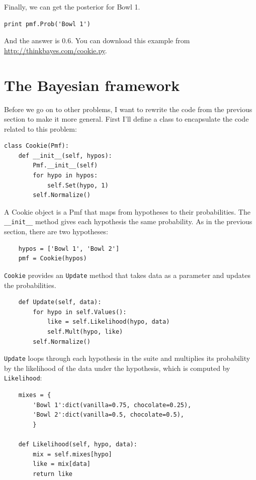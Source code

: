 \documentclass[12pt]{book}
\begin{document}
Finally, we can get the posterior for Bowl 1.

\begin{verbatim}
print pmf.Prob('Bowl 1')
\end{verbatim}

And the answer is 0.6.  You can download this example
from \url{http://thinkbayes.com/cookie.py}.


\section{The Bayesian framework}

Before we go on to other problems, I want to rewrite the code
from the previous section to make it more general.  First I'll
define a class to encapsulate the code related to this problem:

\begin{verbatim}
class Cookie(Pmf):
    def __init__(self, hypos):
        Pmf.__init__(self)
        for hypo in hypos:
            self.Set(hypo, 1)
        self.Normalize()
\end{verbatim}

A Cookie object is a Pmf that maps from hypotheses to their
probabilities.  The \verb"__init__" method gives each hypothesis
the same probability.  As in the previous section, there are
two hypotheses:

\begin{verbatim}
    hypos = ['Bowl 1', 'Bowl 2']
    pmf = Cookie(hypos)
\end{verbatim}

\verb"Cookie" provides an \verb"Update" method that takes
data as a parameter and updates the probabilities.

\begin{verbatim}
    def Update(self, data):
        for hypo in self.Values():
            like = self.Likelihood(hypo, data)
            self.Mult(hypo, like)
        self.Normalize()
\end{verbatim}

\verb"Update" loops through each hypothesis in the suite
and multiplies its probability by the likelihood of the
data under the hypothesis, which is computed by \verb"Likelihood":

\begin{verbatim}
    mixes = {
        'Bowl 1':dict(vanilla=0.75, chocolate=0.25),
        'Bowl 2':dict(vanilla=0.5, chocolate=0.5),
        }

    def Likelihood(self, hypo, data):
        mix = self.mixes[hypo]
        like = mix[data]
        return like
\end{verbatim}
\end{document}
